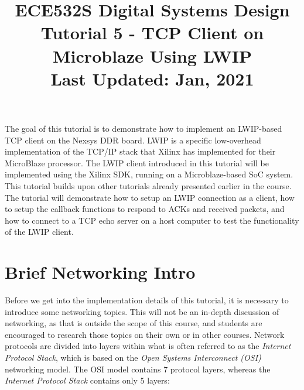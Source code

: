\documentclass[11pt]{article}
\title{ECE532S Digital Systems Design \\ \vspace{0.4cm}
       \Large Tutorial 5 - TCP Client on Microblaze Using LWIP \\ \vspace{0.4cm}
       \small Last Updated: Jan, 2021}
\author{ }
\date{ }
\begin{document}
\maketitle
\vspace{-1cm}

The goal of this tutorial is to demonstrate how to implement an LWIP-based TCP client on the Nexsys DDR board. LWIP is a specific low-overhead implementation of the TCP/IP stack that Xilinx has implemented for their MicroBlaze processor. The LWIP client introduced in this tutorial will be implemented using the Xilinx SDK, running on a Microblaze-based SoC system. This tutorial builds upon other tutorials already presented earlier in the course. The tutorial will demonstrate how to setup an LWIP connection as a client, how to setup the callback functions to respond to ACKs and received packets, and how to connect to a TCP echo server on a host computer to test the functionality of the LWIP client.

\section*{Brief Networking Intro}
Before we get into the implementation details of this tutorial, it is necessary to introduce some networking topics. This will not be an in-depth discussion of networking, as that is outside the scope of this course, and students are encouraged to research those topics on their own or in other courses. Network protocols are divided into layers within what is often referred to as the \textit{Internet Protocol Stack}, which is based on the \textit{Open Systems Interconnect (OSI)} networking model. The OSI model contains 7 protocol layers, whereas the \textit{Internet Protocol Stack} contains only 5 layers:

\renewcommand{\labelitemi}{$\circ$}
\renewcommand{\labelitemii}{$\circ$}
\renewcommand{\labelitemiii}{$\circ$}
\renewcommand{\labelitemiv}{$\circ$}
\end{document}

